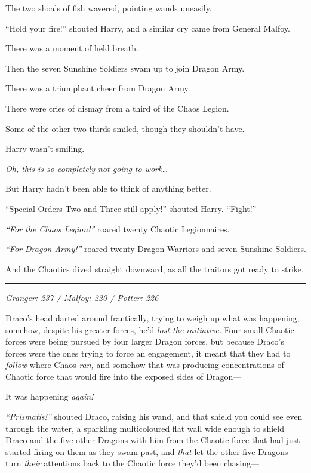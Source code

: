 The two shoals of fish wavered, pointing wands uneasily.

``Hold your fire!'' shouted Harry, and a similar cry came from General
Malfoy.

There was a moment of held breath.

Then the seven Sunshine Soldiers swam up to join Dragon Army.

There was a triumphant cheer from Dragon Army.

There were cries of dismay from a third of the Chaos Legion.

Some of the other two-thirds smiled, though they shouldn't have.

Harry wasn't smiling.

\emph{Oh, this is so completely not going to work\ldots{}}

But Harry hadn't been able to think of anything better.

``Special Orders Two and Three still apply!'' shouted Harry. ``Fight!''

\emph{``For the Chaos Legion!''} roared twenty Chaotic Legionnaires.

\emph{``For Dragon Army!''} roared twenty Dragon Warriors and seven
Sunshine Soldiers.

And the Chaotics dived straight downward, as all the traitors got ready
to strike.

\begin{center}\rule{3in}{0.4pt}\end{center}

\emph{Granger: 237 / Malfoy: 220 / Potter: 226}

Draco's head darted around frantically, trying to weigh up what was
happening; somehow, despite his greater forces, he'd \emph{lost the
initiative.} Four small Chaotic forces were being pursued by four larger
Dragon forces, but because Draco's forces were the ones trying to force
an engagement, it meant that they had to \emph{follow} where Chaos
\emph{ran,} and somehow that was producing concentrations of Chaotic
force that would fire into the exposed sides of Dragon---

It was happening \emph{again!}

\emph{``Prismatis!''} shouted Draco, raising his wand, and that shield
you could see even through the water, a sparkling multicoloured flat
wall wide enough to shield Draco and the five other Dragons with him
from the Chaotic force that had just started firing on them as they swam
past, and \emph{that} let the other five Dragons turn \emph{their}
attentions back to the Chaotic force they'd been chasing---

